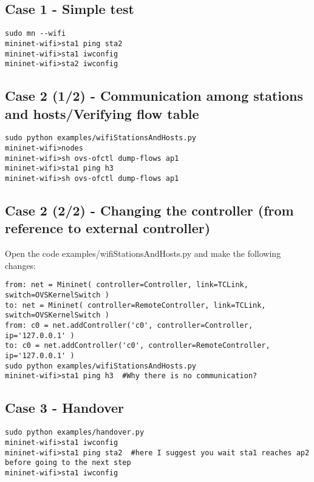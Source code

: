 \subsection{Case 1 - Simple test}
\begin{verbatim}
sudo mn --wifi  
mininet-wifi>sta1 ping sta2  
mininet-wifi>sta1 iwconfig  
mininet-wifi>sta2 iwconfig
\end{verbatim}
   
\subsection{Case 2 (1/2) - Communication among stations and hosts/Verifying flow table}
\begin{verbatim}
sudo python examples/wifiStationsAndHosts.py  
mininet-wifi>nodes  
mininet-wifi>sh ovs-ofctl dump-flows ap1  
mininet-wifi>sta1 ping h3  
mininet-wifi>sh ovs-ofctl dump-flows ap1 
\end{verbatim}

\subsection{Case 2 (2/2) - Changing the controller (from reference to external controller)}

Open the code examples/wifiStationsAndHosts.py and make the following changes:

\begin{verbatim}
from: net = Mininet( controller=Controller, link=TCLink, switch=OVSKernelSwitch )  
to: net = Mininet( controller=RemoteController, link=TCLink, switch=OVSKernelSwitch )  
from: c0 = net.addController('c0', controller=Controller, ip='127.0.0.1' )  
to: c0 = net.addController('c0', controller=RemoteController, ip='127.0.0.1' )  
sudo python examples/wifiStationsAndHosts.py  
mininet-wifi>sta1 ping h3  #Why there is no communication? 
\end{verbatim}
  
\subsection{Case 3 - Handover}
\begin{verbatim}
sudo python examples/handover.py  
mininet-wifi>sta1 iwconfig  
mininet-wifi>sta1 ping sta2  #here I suggest you wait sta1 reaches ap2 before going to the next step
mininet-wifi>sta1 iwconfig  
\end{verbatim}
 
